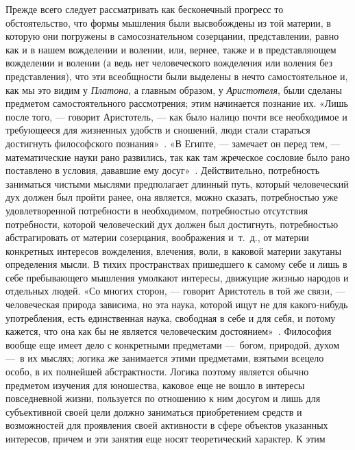 Прежде всего следует рассматривать как бесконечный прогресс то
обстоятельство, что формы мышления были высвобождены из той материи, в
которую они погружены в самосознательном созерцании, представлении, равно
как и в нашем вожделении и волении, или, вернее, также и в представляющем
вожделении и волении (а ведь нет человеческого вожделения или воления без
представления), что эти всеобщности были выделены в нечто самостоятельное
и, как мы это видим у {\em Платона}, а главным образом,
у {\em Аристотеля}, были сделаны предметом
самостоятельного рассмотрения; этим начинается познание их. «Лишь после
того, — говорит Аристотель, — как было налицо почти все необходимое и
требующееся для жизненных удобств и сношений, люди стали стараться
достигнуть философского
познания»~\textstyleEndnodeLink{(\ref{bkm:Ref474656188}}\label{bkm:bm05}\textstyleEndnodeLink{)}.
«В Египте, — замечает он перед тем, — математические науки рано развились,
так как там жреческое сословие было рано поставлено в условия, дававшие ему
досуг»~\textstyleEndnodeLink{(\ref{bkm:Ref474656193}}\label{bkm:bm06}\textstyleEndnodeLink{)}.
Действительно, потребность заниматься чистыми мыслями предполагает длинный
путь, который человеческий дух должен был пройти ранее, она является, можно
сказать, потребностью уже удовлетворенной потребности в необходимом,
потребностью отсутствия потребности, которой человеческий дух должен был
достигнуть, потребностью абстрагировать от материи созерцания, воображения
и~т.~д., от материи конкретных интересов вожделения, влечения, воли, в
каковой материи закутаны определения мысли. В тихих пространствах
пришедшего к самому себе и лишь в себе пребывающего мышления умолкают
интересы, движущие жизнью народов и отдельных людей. «Со многих сторон, —
говорит Аристотель в той же связи, — человеческая природа зависима, но эта
наука, которой ищут не для какого-нибудь употребления, есть единственная
наука, свободная в себе и для себя, и потому кажется, что она как бы не
является человеческим
достоянием»~\textstyleEndnodeLink{(\ref{bkm:Ref474656208}}\label{bkm:bm07}\textstyleEndnodeLink{)}.
Философия вообще еще имеет дело с конкретными предметами —~богом, природой,
духом —~в их мыслях; логика же занимается этими предметами, взятыми всецело
особо, в их полнейшей абстрактности. Логика поэтому является обычно
предметом изучения для юношества, каковое еще не вошло в интересы
повседневной жизни, пользуется по отношению к ним досугом и лишь для
субъективной своей цели должно заниматься приобретением средств и
возможностей для проявления своей активности в сфере объектов указанных
интересов, причем и эти занятия еще носят теоретический характер. К этим
